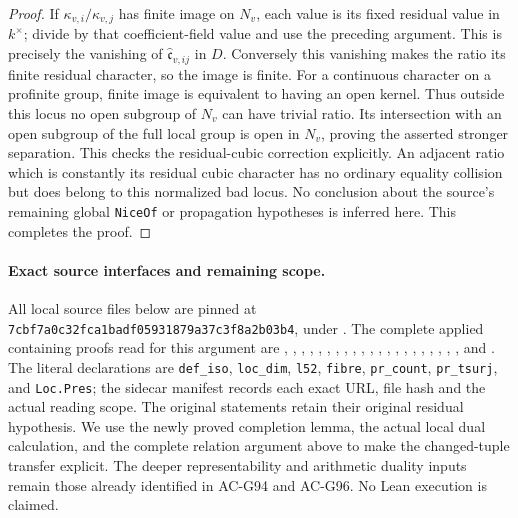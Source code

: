 \begin{proof}
If \(\kappa_{v,i}/\kappa_{v,j}\) has finite image on \(N_v\),
each value is its fixed residual value in \(k^\times\);
divide by that coefficient-field value and use the preceding
argument.  This is precisely the vanishing of
\(\widehat{\mathfrak c}_{v,ij}\) in \(D\).
Conversely this vanishing makes the ratio its finite residual
character, so the image is finite.
For a continuous character on a profinite group, finite image
is equivalent to having an open kernel.  Thus outside this
locus no open subgroup of \(N_v\) can have trivial ratio.
Its intersection with an open subgroup of the full local group
is open in \(N_v\), proving the asserted stronger separation.
This checks the residual-cubic correction explicitly.
An adjacent ratio which is constantly its residual cubic
character has no ordinary equality collision but does belong
to this normalized bad locus.
No conclusion about the source's remaining global
\texttt{NiceOf} or propagation hypotheses is inferred here.
This completes the proof.
\end{proof}

\paragraph{Exact source interfaces and remaining scope.}
All local source files below are pinned at
\texttt{7cbf7a0c32fca1badf05931879a37c3f8a2b03b4},
under
.
The complete applied containing proofs read for this argument are
,
, ,
,
,
, ,
, , ,
, , ,
, ,
, ,
, ,
, , and
.
The literal declarations are \texttt{def\_iso},
\texttt{loc\_dim}, \texttt{l52}, \texttt{fibre},
\texttt{pr\_count}, \texttt{pr\_tsurj}, and
\texttt{Loc.Pres}; the sidecar manifest records each exact
URL, file hash and the actual reading scope.
The original statements retain their original residual hypothesis.
We use the newly proved completion lemma, the actual local dual
calculation, and the complete relation argument above to make
the changed-tuple transfer explicit.
The deeper representability and arithmetic duality inputs remain
those already identified in AC-G94 and AC-G96.
No Lean execution is claimed.

